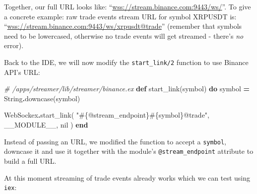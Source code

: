 \documentclass[
]{book}
\newenvironment{Shaded}{\begin{snugshade}}{\end{snugshade}}
\newcommand{\CommentTok}[1]{\textcolor[rgb]{0.56,0.35,0.01}{\textit{#1}}}
\newcommand{\ConstantTok}[1]{\textcolor[rgb]{0.00,0.00,0.00}{#1}}
\newcommand{\KeywordTok}[1]{\textcolor[rgb]{0.13,0.29,0.53}{\textbf{#1}}}
\newcommand{\NormalTok}[1]{#1}
\newcommand{\OperatorTok}[1]{\textcolor[rgb]{0.81,0.36,0.00}{\textbf{#1}}}
\newcommand{\OtherTok}[1]{\textcolor[rgb]{0.56,0.35,0.01}{#1}}
\newcommand{\StringTok}[1]{\textcolor[rgb]{0.31,0.60,0.02}{#1}}
\begin{document}
Together, our full URL looks like: ``\url{wss://stream.binance.com:9443/ws/}\citet{trade}''.
To give a concrete example: raw trade events stream URL for symbol XRPUSDT is:
``\url{wss://stream.binance.com:9443/ws/xrpusdt@trade}'' (remember that symbols need to be lowercased, otherwise no trade events will get streamed - there's \emph{no} error).

Back to the IDE, we will now modify the \texttt{start\_link/2} function to use Binance API's URL:

\begin{Shaded}
\begin{Highlighting}[]
  \CommentTok{\# /apps/streamer/lib/streamer/binance.ex}
  \KeywordTok{def}\NormalTok{ start\_link(symbol) }\KeywordTok{do}
\NormalTok{    symbol }\OperatorTok{=} \ConstantTok{String}\OperatorTok{.}\NormalTok{downcase(symbol)}

    \ConstantTok{WebSockex}\OperatorTok{.}\NormalTok{start\_link(}
      \StringTok{"}\OtherTok{\#\{@stream\_endpoint\}\#\{}\NormalTok{symbol}\OtherTok{\}}\StringTok{@trade"}\NormalTok{,}
      \ConstantTok{\_\_MODULE\_\_}\NormalTok{,}
      \ConstantTok{nil}
\NormalTok{    )}
  \KeywordTok{end}
\end{Highlighting}
\end{Shaded}

Instead of passing an URL, we modified the function to accept a \texttt{symbol}, downcase it and use it together with the module's \texttt{@stream\_endpoint} attribute to build a full URL.

At this moment streaming of trade events already works which we can test using \texttt{iex}:
\end{document}
